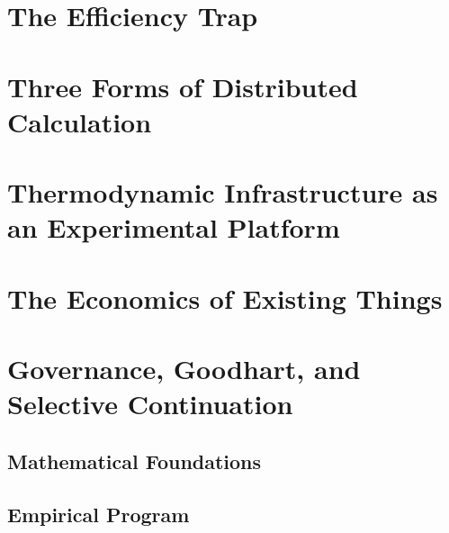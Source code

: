 \documentclass[11pt,openany]{book}
\theoremstyle{plain}
\theoremstyle{definition}
\theoremstyle{remark}
\begin{document}
\tableofcontents

\mainmatter

\part{The Efficiency Trap}





\part{Three Forms of Distributed Calculation}





\part{Thermodynamic Infrastructure as an Experimental Platform}





\part{The Economics of Existing Things}




\part{Governance, Goodhart, and Selective Continuation}




\appendix
\chapter{Mathematical Foundations}


\chapter{Empirical Program}


\backmatter
\end{document}
